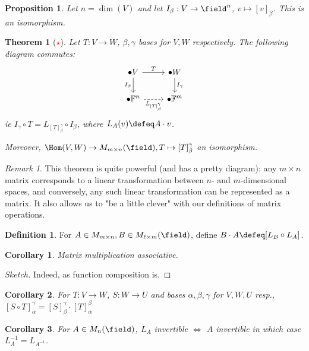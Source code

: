 \documentclass[12pt, oneside]{article}
\theoremstyle{definition}
\newtheorem{defn}{Definition}
\theoremstyle{plain}
\newtheorem{thm}{Theorem}
\newtheorem{cor}{Corollary}
\newtheorem{prop}{Proposition}
\theoremstyle{remark}
\newtheorem{remark}{Remark}
\begin{document}
\begin{prop}
  Let $n = \dim(V)$ and let $I_\beta : V \to \field^n$, $v \mapsto [v]_\beta$. This is an isomorphism.
\end{prop}

\begin{thm}[\textcolor{red}{$\star$}]
  Let $T : V \to W$, $\beta, \gamma$ bases for $V, W$ respectively. The following diagram commutes:
  \[
    \begin{tikzcd}
      {\bullet V} & {\bullet W} \\
      {\bullet \mathbb{F}^n} & {\bullet \mathbb{F}^m}
      \arrow[from=1-1, to=1-2, "T"]
      \arrow["{I_\beta}"', from=1-1, to=2-1]
      \arrow["{I_\gamma}", from=1-2, to=2-2]
      \arrow["{L_{[T]_\beta^\gamma}}"', from=2-1, to=2-2, dashed]
  \end{tikzcd}
    \]
    ie $I_\gamma \circ T = L_{[T]_\beta^\gamma} \circ I_\beta$, where $L_A(v) \defeq A \cdot v$.
    
    Moreover, $\Hom(V, W) \to M_{m \times n}(\field), T \mapsto [T]_\beta^\gamma$ an isomorphism.
\end{thm}

\begin{remark}
  This theorem is quite powerful (and has a pretty diagram): any $m \times n$ matrix corresponds to a linear transformation between $n$- and $m$-dimensional spaces, and conversely, any such linear transformation can be represented as a matrix. It also allows us to "be a little clever" with our definitions of matrix operations.
\end{remark}

\begin{defn}
  For $A \in M_{m \times n}, B \in M_{\ell \times m}(\field)$, define $B \cdot A \defeq [L_B \circ L_A]$.
\end{defn}
\begin{cor}
  Matrix multiplication associative.
\end{cor}
\begin{proof}[Sketch]
  Indeed, as function composition is.
\end{proof}

\begin{cor}
  For $T : V\to W$, $S : W \to U$ and bases $\alpha, \beta, \gamma$ for $V, W , U$ resp., $[S \circ T]_\alpha^\gamma = [S]_\beta^\gamma \cdot [T]_\alpha^\beta$
\end{cor}

\begin{cor}
  For $A \in M_n(\field)$, $L_A$ invertible $\iff$ $A$ invertible in which case $L_A^{-1} = L_{A^{-1}}$.
\end{cor}
\end{document}
